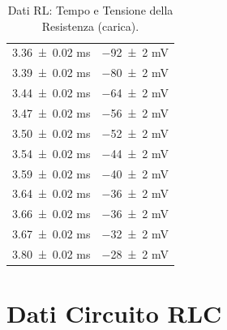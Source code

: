 \documentclass[a4paper]{article}
\begin{document}
\begin{appendices}
\begin{table}[htbp]
\begin{minipage}{0.48\textwidth}
\begin{tabular}{|c|c|}
        \num{3.36  \pm 0.02} \si{\milli\second} & \num{-92  \pm 2} \si{\milli\volt} \\
        \num{3.39  \pm 0.02} \si{\milli\second} & \num{-80  \pm 2} \si{\milli\volt} \\
        \num{3.44  \pm 0.02} \si{\milli\second} & \num{-64  \pm 2} \si{\milli\volt} \\
        \num{3.47  \pm 0.02} \si{\milli\second} & \num{-56  \pm 2} \si{\milli\volt} \\
        \num{3.50  \pm 0.02} \si{\milli\second} & \num{-52  \pm 2} \si{\milli\volt} \\
        \num{3.54  \pm 0.02} \si{\milli\second} & \num{-44  \pm 2} \si{\milli\volt} \\
        \num{3.59  \pm 0.02} \si{\milli\second} & \num{-40  \pm 2} \si{\milli\volt} \\
        \num{3.64  \pm 0.02} \si{\milli\second} & \num{-36  \pm 2} \si{\milli\volt} \\
        \num{3.66  \pm 0.02} \si{\milli\second} & \num{-36  \pm 2} \si{\milli\volt} \\
        \num{3.67  \pm 0.02} \si{\milli\second} & \num{-32  \pm 2} \si{\milli\volt} \\
        \num{3.80  \pm 0.02} \si{\milli\second} & \num{-28  \pm 2} \si{\milli\volt} \\
        \hline
        \end{tabular}
       \caption{Dati RL: Tempo e Tensione della Resistenza (carica).}
       \label{tab:rl_data_carica_r}
    \end{minipage}
\end{table}

\newpage %

\section{Dati Circuito RLC} \label{app:dati_rlc}
\setcounter{table}{0} %


\end{appendices}
\end{document}
